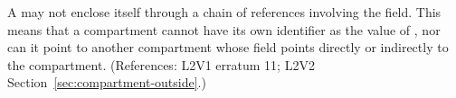 A \Compartment may not enclose itself through a chain of references
involving the  field.  This means that a compartment cannot
have its own identifier as the value of , nor can it point
to another compartment whose  field points directly or
indirectly to the compartment.  (References: L2V1 erratum 11; L2V2
Section~\ref{sec:compartment-outside}.)
